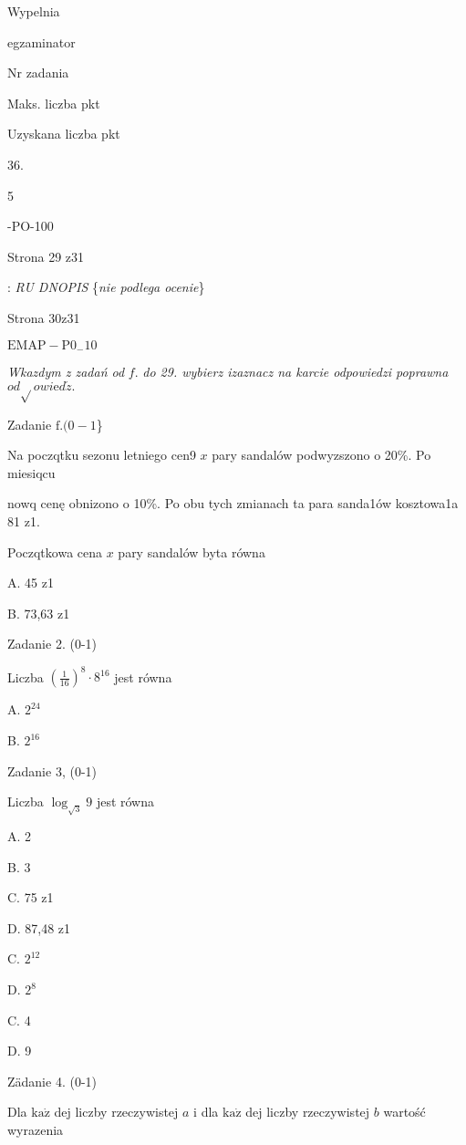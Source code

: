 \documentclass[a4paper,12pt]{article}
\begin{document}
Wypelnia

egzaminator

Nr zadania

Maks. liczba pkt

Uzyskana liczba pkt

36.

5

-PO-100

Strona 29 z31





: {\it RU DNOPIS} \{{\it nie podlega ocenie}\}

Strona 30z31

$\mathrm{E}\mathrm{M}\mathrm{A}\mathrm{P}-\mathrm{P}0_{-}10$





{\it Wkazdym z zadań od} $f.$ {\it do 29. wybierz izaznacz na karcie odpowiedzi poprawna} $od\sqrt{}owi\mathrm{e}d\acute{z}.$

Zadanie $\mathrm{f}. (0-1$\}

Na poczqtku sezonu letniego cen9 $x$ pary sandalów podwyzszono o 20\%. Po miesiqcu

nowq cenę obnizono o 10\%. Po obu tych zmianach ta para sanda1ów kosztowa1a 81 z1.

Poczqtkowa cena $x$ pary sandalów byta równa

A. 45 z1

B. 73,63 z1

Zadanie 2. (0-1)

Liczba $(\displaystyle \frac{1}{16})^{8}\cdot 8^{16}$ jest równa

A. $2^{24}$

B. $2^{16}$

Zadanie 3, (0-1)

Liczba $\log_{\sqrt{3}}9$ jest równa

A. 2

B. 3

C. 75 z1

D. 87,48 z1

C. $2^{12}$

D. $2^{8}$

C. 4

D. 9

Zädanie 4. (0-1)

Dla $\mathrm{k}\mathrm{a}\dot{\mathrm{z}}$ dej liczby rzeczywistej $a$ i dla $\mathrm{k}\mathrm{a}\dot{\mathrm{z}}$ dej liczby rzeczywistej $b$ wartość wyrazenia
\end{document}
